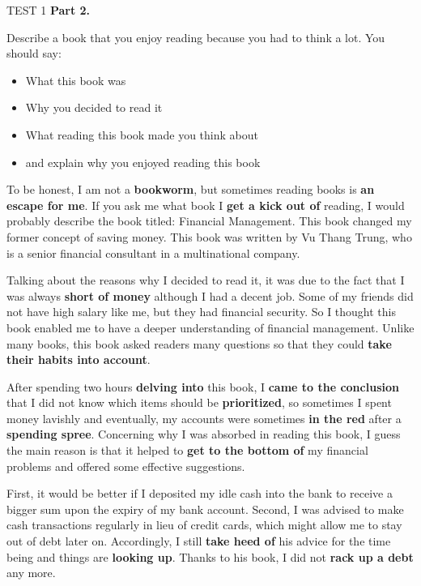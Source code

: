 \begin{glossarymc}[Cambridge 14]
\begin{test}{TEST 1}
    \noindent
    \textbf{Part 2.}
    \begin{qa}{Describe a book that you enjoy reading because you had to think a lot. You should say:
    \begin{itemize}
        \item What this book was
        \item Why you decided to read it
        \item What reading this book made you think about
        \item and explain why you enjoyed reading this book
    \end{itemize}}

    To be honest, I am not a \textbf{bookworm}, but sometimes reading books is \textbf{an escape for me}. If you ask me what book I \textbf{get a kick out of} reading, I would probably describe the book titled: Financial Management. This book changed my former concept of saving money. This book was written by Vu Thang Trung, who is a senior financial consultant in a multinational company. 

    Talking about the reasons why I decided to read it, it was due to the fact that I was always \textbf{short of money} although I had a decent job. Some of my friends did not have high salary like me, but they had financial security. So I thought this book enabled me to have a deeper understanding of financial management. Unlike many books, this book asked readers many questions so that they could \textbf{take their habits into account}. 

    After spending two hours \textbf{delving into} this book, I \textbf{came to the conclusion} that I did not know which items should be \textbf{prioritized}, so sometimes I spent money lavishly and eventually, my accounts were sometimes \textbf{in the red} after a \textbf{spending spree}. Concerning why I was absorbed in reading this book, I guess the main reason is that it helped to \textbf{get to the bottom of} my financial problems and offered some effective suggestions. 

    First, it would be better if I deposited my idle cash into the bank to receive a bigger sum upon the expiry of my bank account. Second, I was advised to make cash transactions regularly in lieu of credit cards, which might allow me to stay out of debt later on. Accordingly, I still \textbf{take heed of} his advice for the time being and things are \textbf{looking up}. Thanks to his book, I did not \textbf{rack up a debt} any more.
    \end{qa}


\end{test}
\end{glossarymc}
